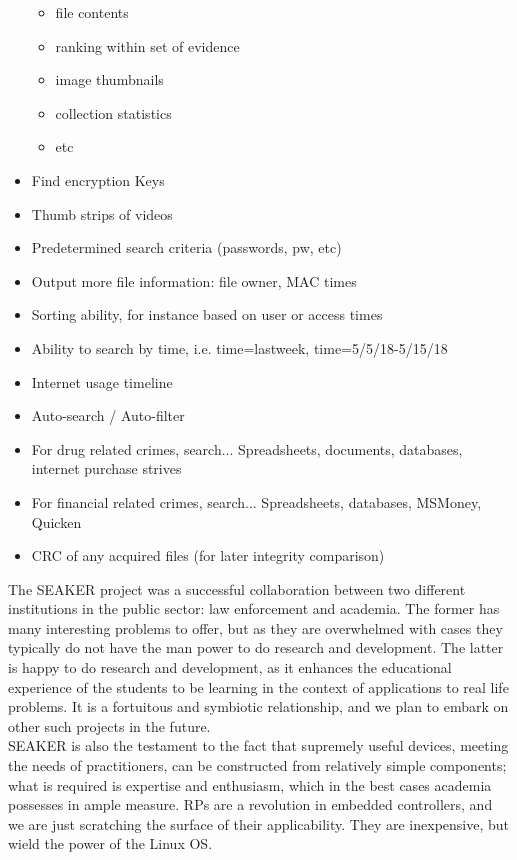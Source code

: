 \documentclass[12pt]{article}
\begin{document}
\begin{itemize}
\begin{itemize}
    \item file contents
    \item ranking within set of evidence
    \item image thumbnails
    \item collection statistics
    \item etc
  \end{itemize}
  \item Find encryption Keys 
  \item Thumb strips of videos
  \item Predetermined search criteria (passwords, pw, etc)
  \item Output more file information: file owner, MAC times
  \item Sorting ability, for instance based on user or access times
  \item Ability to search by time, i.e. time=lastweek, time=5/5/18-5/15/18
  \item Internet usage timeline
  \item Auto-search / Auto-filter
  \item For drug related crimes, search... Spreadsheets, documents, databases, internet purchase strives
  \item For financial related crimes, search... Spreadsheets, databases, MSMoney, Quicken
  \item CRC of any acquired files (for later integrity comparison)
\end{itemize}

\vspace{0.4 cm}
The SEAKER project was a successful collaboration between two different institutions in the public
sector: law enforcement and academia. The former has many interesting problems to offer, but as they
are overwhelmed with cases they typically do not have the man power to do research and development.
The latter is happy to do research and development, as it enhances the educational experience of the students to be learning
in the context of applications to real life problems. It is a fortuitous and symbiotic relationship, and we
plan to embark on other such projects in the future.\\

SEAKER is also the testament to the fact that supremely useful devices, meeting the needs of
practitioners, can be constructed from relatively simple components; what is required is expertise and
enthusiasm, which in the best cases academia possesses in ample measure. RPs are a revolution in
embedded controllers, and we are just scratching the surface of their applicability. They are inexpensive,
but wield the power of the Linux OS.\\
\end{document}
